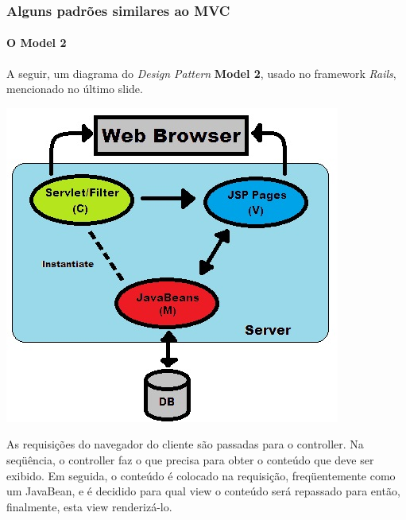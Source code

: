 \documentclass{beamer}
\begin{document}
\begin{frame}
\frametitle{Alguns padrões similares ao MVC}
\framesubtitle{O Model 2}
	A seguir, um diagrama do \textit{Design Pattern} \textbf{Model 2}, usado no framework \textit{Rails}, mencionado no último slide.
	\begin{center}
		\includegraphics[scale=0.2]{Model2.jpg}
	\end{center}
	As requisições do navegador do cliente são passadas para o controller. Na seqüência, o controller faz o que precisa para obter o conteúdo que deve ser exibido.
	Em seguida, o conteúdo é colocado na requisição, freqüentemente como um JavaBean, e é decidido para qual view o conteúdo será repassado para então, finalmente, esta
	view renderizá-lo.
\end{frame}
\end{document}
